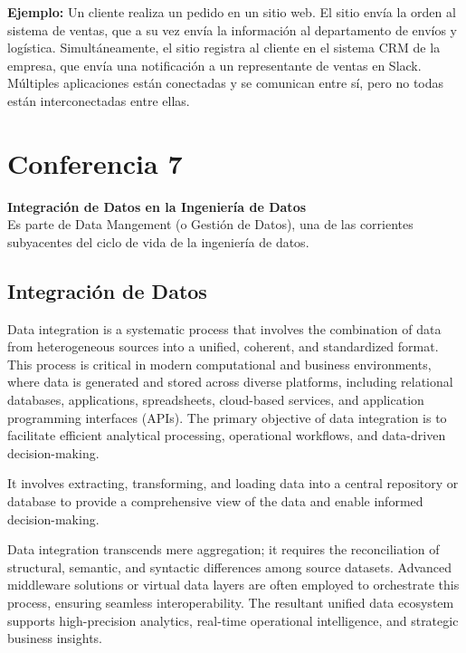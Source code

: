 \documentclass[12pt]{book}
\begin{document}
\textbf{Ejemplo:} Un cliente realiza un pedido en un sitio web. El sitio envía la orden al sistema de ventas, que a su vez envía la información al departamento de envíos y logística. Simultáneamente, el sitio registra al cliente en el sistema CRM de la empresa, que envía una notificación a un representante de ventas en Slack. Múltiples aplicaciones están conectadas y se comunican entre sí, pero no todas están interconectadas entre ellas.

\chapter{Conferencia 7}
\normalfont\LARGE \textbf{Integración de Datos en la Ingeniería de Datos}
\normalfont\small\\
Es parte de Data Mangement (o Gestión de Datos), una de las corrientes subyacentes del ciclo de vida de la ingeniería de datos.
\section{Integración de Datos}
Data integration is a systematic process that involves the combination of data from heterogeneous sources 
into a unified, coherent, and standardized format. This process is critical in modern computational and 
business environments, where data is generated and stored across diverse platforms, including relational 
databases, applications, spreadsheets, cloud-based services, and application programming interfaces (APIs). 
The primary objective of data integration is to facilitate efficient analytical processing, operational workflows, 
and data-driven decision-making.

It involves extracting, transforming, and loading data into a central repository or database to provide 
a comprehensive view of the data and enable informed decision-making.

Data integration transcends mere aggregation; it requires the reconciliation of structural, semantic, and syntactic differences among source datasets. Advanced middleware solutions or virtual data layers are often employed to orchestrate this process, ensuring seamless interoperability. The resultant unified data ecosystem supports high-precision analytics, real-time operational intelligence, and strategic business insights.
\end{document}
